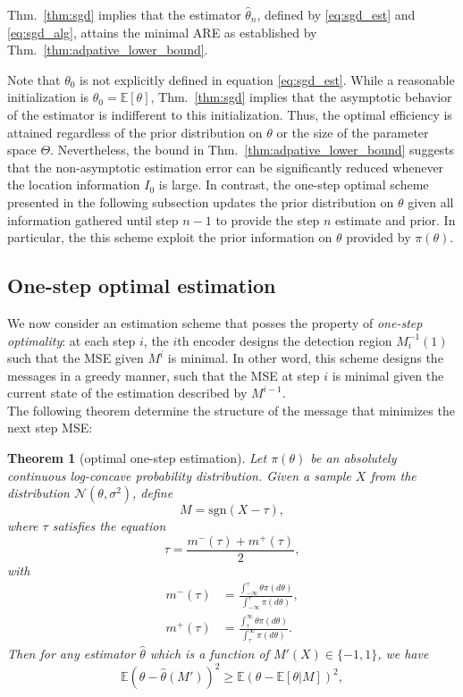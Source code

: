 \documentclass[letterpaper, conference]{IEEEtran}      %
\newtheorem{thm}{\bf{Theorem}}
\newcommand{\sgn}{\mathrm{sgn} }
\begin{document}
Thm.~\ref{thm:sgd} implies that the estimator $\widehat{\theta}_n$, defined by \eqref{eq:sgd_est} and \eqref{eq:sgd_alg}, attains the minimal ARE as established by Thm.~\ref{thm:adpative_lower_bound}.
\par
Note that $\theta_0$ is not explicitly defined 
in equation \eqref{eq:sgd_est}. While a reasonable initialization is $\theta_0 = \mathbb E [\theta]$,  Thm.~\ref{thm:sgd} implies that the asymptotic behavior of the estimator is indifferent to this initialization. Thus, the optimal efficiency is attained regardless of the prior distribution on $\theta$ or the size of the parameter space $\Theta$. Nevertheless, the bound in Thm.~\ref{thm:adpative_lower_bound} suggests that the non-asymptotic estimation error can be significantly reduced whenever the location information $I_0$ is large. In contrast, the one-step optimal scheme presented in the following subsection updates the prior distribution on $\theta$ given all information gathered until step $n-1$ to provide the step $n$ estimate and prior. In particular, the this scheme exploit the prior information on $\theta$ provided by $\pi(\theta)$. 

\subsection{One-step optimal estimation}
We now consider an estimation scheme that posses the property of \emph{one-step optimality}: at each step $i$, the $i$th encoder designs the detection region $M_i^{-1}(1)$ such that the MSE given $M^i$ is minimal. In other word, this scheme designs the messages in a greedy manner, such that the MSE at step $i$ is minimal given the current state of the estimation described by $M^{i-1}$. \\

The following theorem determine the structure of the message that minimizes the next step MSE:
\begin{thm}[optimal one-step estimation] \label{thm:opt_one_step}
Let $\pi(\theta)$ be an absolutely continuous log-concave probability distribution. Given a sample $X$ from the distribution $\mathcal N(\theta, \sigma^2)$, define 
\begin{equation}
\label{eq:adaptive_main_message}
M = \sgn(X - \tau),
\end{equation}
where $\tau$ satisfies the equation
\begin{equation}
 \label{eq:fixed_point}
 \tau = \frac{m^-(\tau) + m^+(\tau)}{2},
\end{equation}
with
\begin{align*}
m^-(\tau)  & = \frac{\int_{-\infty}^{\tau} \theta \pi(d\theta) }{\int_{-\infty}^{\tau} \pi(d\theta)} ,\\
m^+(\tau) & = \frac{\int_{\tau}^\infty \theta \pi(d\theta) }{\int_{\tau}^\infty \pi(d\theta)} .
\end{align*}
Then for any estimator $\widehat{\theta}$ which is a function of $M'(X) \in \{-1,1\}$, we have
\begin{equation}
\label{eq:opt_cond}
\mathbb E \left(\theta-\widehat{\theta}(M')\right)^2 \geq  \mathbb E \left(\theta- \mathbb E[\theta|M]\right)^2,
\end{equation}
\end{thm}
\end{document}
